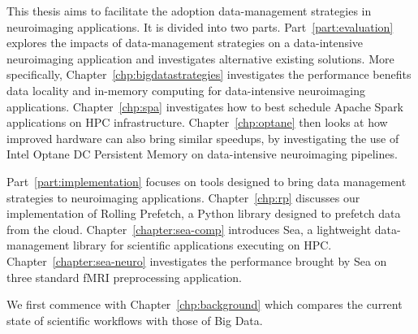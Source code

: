 	This thesis aims to facilitate the adoption data-management strategies in neuroimaging applications. 
        It is divided into two parts.
        Part~\ref{part:evaluation} explores the impacts of data-management strategies
        on a data-intensive neuroimaging application
        and investigates alternative existing solutions. More specifically,
        Chapter~\ref{chp:bigdatastrategies} investigates the performance
        benefits data locality and in-memory computing for data-intensive
        neuroimaging applications. Chapter~\ref{chp:spa} investigates how to
        best schedule Apache Spark applications on HPC infrastructure.
        Chapter~\ref{chp:optane} then looks at how improved hardware can also
        bring similar speedups, by investigating the use of Intel Optane DC
        Persistent Memory on data-intensive neuroimaging pipelines.

        Part~\ref{part:implementation} focuses on tools designed to bring
        data management strategies to neuroimaging applications. Chapter~\ref{chp:rp}
        discusses our implementation of Rolling Prefetch, a Python library designed to
        prefetch data from the cloud. Chapter~\ref{chapter:sea-comp} introduces Sea, a lightweight 
        data-management library for scientific applications executing on HPC. Chapter~\ref{chapter:sea-neuro}
        investigates the performance brought by Sea on three standard fMRI preprocessing application.

        We first commence with Chapter~\ref{chp:background} which compares the current state of scientific workflows
        with those of Big Data.


